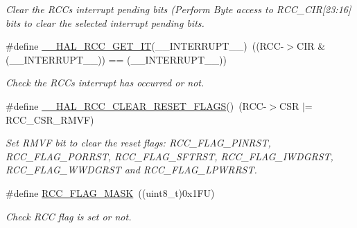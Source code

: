 \begin{DoxyCompactItemize}
\begin{DoxyCompactList}\small\item\em Clear the R\+CC\textquotesingle{}s interrupt pending bits (Perform Byte access to R\+C\+C\+\_\+\+C\+IR\mbox{[}23\+:16\mbox{]} bits to clear the selected interrupt pending bits. \end{DoxyCompactList}\item 
\#define \mbox{\hyperlink{group___r_c_c___flags___interrupts___management_ga134af980b892f362c05ae21922cd828d}{\+\_\+\+\_\+\+H\+A\+L\+\_\+\+R\+C\+C\+\_\+\+G\+E\+T\+\_\+\+IT}}(\+\_\+\+\_\+\+I\+N\+T\+E\+R\+R\+U\+P\+T\+\_\+\+\_\+)~((R\+CC-\/$>$C\+IR \& (\+\_\+\+\_\+\+I\+N\+T\+E\+R\+R\+U\+P\+T\+\_\+\+\_\+)) == (\+\_\+\+\_\+\+I\+N\+T\+E\+R\+R\+U\+P\+T\+\_\+\+\_\+))
\begin{DoxyCompactList}\small\item\em Check the R\+CC\textquotesingle{}s interrupt has occurred or not. \end{DoxyCompactList}\item 
\mbox{\label{group___r_c_c___flags___interrupts___management_gaf28c11b36035ef1e27883ff7ee2c46b0}} 
\#define \mbox{\hyperlink{group___r_c_c___flags___interrupts___management_gaf28c11b36035ef1e27883ff7ee2c46b0}{\+\_\+\+\_\+\+H\+A\+L\+\_\+\+R\+C\+C\+\_\+\+C\+L\+E\+A\+R\+\_\+\+R\+E\+S\+E\+T\+\_\+\+F\+L\+A\+GS}}()~(R\+CC-\/$>$C\+SR $\vert$= R\+C\+C\+\_\+\+C\+S\+R\+\_\+\+R\+M\+VF)
\begin{DoxyCompactList}\small\item\em Set R\+M\+VF bit to clear the reset flags\+: R\+C\+C\+\_\+\+F\+L\+A\+G\+\_\+\+P\+I\+N\+R\+ST, R\+C\+C\+\_\+\+F\+L\+A\+G\+\_\+\+P\+O\+R\+R\+ST, R\+C\+C\+\_\+\+F\+L\+A\+G\+\_\+\+S\+F\+T\+R\+ST, R\+C\+C\+\_\+\+F\+L\+A\+G\+\_\+\+I\+W\+D\+G\+R\+ST, R\+C\+C\+\_\+\+F\+L\+A\+G\+\_\+\+W\+W\+D\+G\+R\+ST and R\+C\+C\+\_\+\+F\+L\+A\+G\+\_\+\+L\+P\+W\+R\+R\+ST. \end{DoxyCompactList}\item 
\#define \mbox{\hyperlink{group___r_c_c___flags___interrupts___management_ga80017c6bf8a5c6f53a1a21bb8db93a82}{R\+C\+C\+\_\+\+F\+L\+A\+G\+\_\+\+M\+A\+SK}}~((uint8\+\_\+t)0x1\+F\+U)
\begin{DoxyCompactList}\small\item\em Check R\+CC flag is set or not. \end{DoxyCompactList}\item 
\mbox{\label{group___r_c_c___flags___interrupts___management_gae2d7d461630562bf2a2ddb31b1f96449}} 

\end{DoxyCompactItemize}
